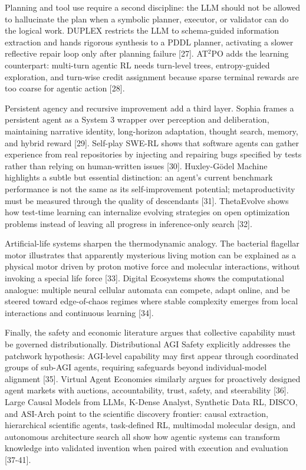 \documentclass[11pt]{article}
\begin{document}
Planning and tool use require a second discipline: the LLM should not be allowed to hallucinate the plan when a symbolic planner, executor, or validator can do the logical work. DUPLEX restricts the LLM to schema-guided information extraction and hands rigorous synthesis to a PDDL planner, activating a slower reflective repair loop only after planning failure {[}27{]}. AT\(^2\)PO adds the learning counterpart: multi-turn agentic RL needs turn-level trees, entropy-guided exploration, and turn-wise credit assignment because sparse terminal rewards are too coarse for agentic action {[}28{]}.

Persistent agency and recursive improvement add a third layer. Sophia frames a persistent agent as a System 3 wrapper over perception and deliberation, maintaining narrative identity, long-horizon adaptation, thought search, memory, and hybrid reward {[}29{]}. Self-play SWE-RL shows that software agents can gather experience from real repositories by injecting and repairing bugs specified by tests rather than relying on human-written issues {[}30{]}. Huxley-Gödel Machine highlights a subtle but essential distinction: an agent's current benchmark performance is not the same as its self-improvement potential; metaproductivity must be measured through the quality of descendants {[}31{]}. ThetaEvolve shows how test-time learning can internalize evolving strategies on open optimization problems instead of leaving all progress in inference-only search {[}32{]}.

Artificial-life systems sharpen the thermodynamic analogy. The bacterial flagellar motor illustrates that apparently mysterious living motion can be explained as a physical motor driven by proton motive force and molecular interactions, without invoking a special life force {[}33{]}. Digital Ecosystems shows the computational analogue: multiple neural cellular automata can compete, adapt online, and be steered toward edge-of-chaos regimes where stable complexity emerges from local interactions and continuous learning {[}34{]}.

Finally, the safety and economic literature argues that collective capability must be governed distributionally. Distributional AGI Safety explicitly addresses the patchwork hypothesis: AGI-level capability may first appear through coordinated groups of sub-AGI agents, requiring safeguards beyond individual-model alignment {[}35{]}. Virtual Agent Economies similarly argues for proactively designed agent markets with auctions, accountability, trust, safety, and steerability {[}36{]}. Large Causal Models from LLMs, K-Dense Analyst, Synthetic Data RL, DISCO, and ASI-Arch point to the scientific discovery frontier: causal extraction, hierarchical scientific agents, task-defined RL, multimodal molecular design, and autonomous architecture search all show how agentic systems can transform knowledge into validated invention when paired with execution and evaluation {[}37-41{]}.
\end{document}
